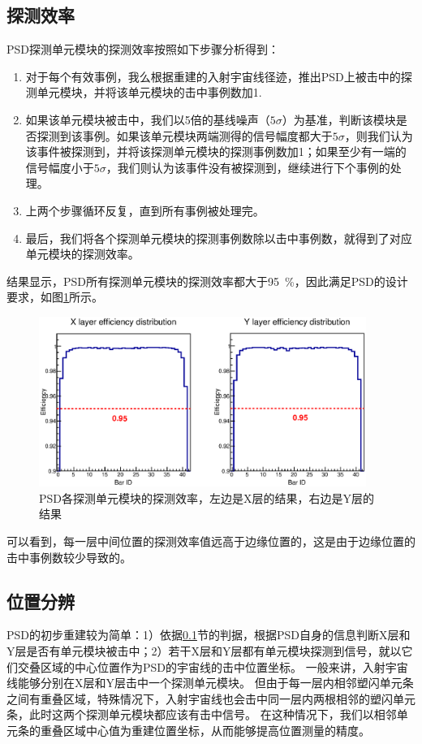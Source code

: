 \subsection{探测效率}
\label{sec:cosmic_ray:efficiency}
PSD探测单元模块的探测效率按照如下步骤分析得到：
\begin{enumerate}
	\item 对于每个有效事例，我么根据重建的入射宇宙线径迹，推出PSD上被击中的探测单元模块，并将该单元模块的击中事例数加1.
	\item 如果该单元模块被击中，我们以5倍的基线噪声（$5\sigma$）为基准，判断该模块是否探测到该事例。如果该单元模块两端测得的信号幅度都大于$5\sigma$，则我们认为该事件被探测到，并将该探测单元模块的探测事例数加1；如果至少有一端的信号幅度小于$5\sigma$，我们则认为该事件没有被探测到，继续进行下个事例的处理。
	\item 上两个步骤循环反复，直到所有事例被处理完。
	\item 最后，我们将各个探测单元模块的探测事例数除以击中事例数，就得到了对应单元模块的探测效率。
\end{enumerate}
结果显示，PSD所有探测单元模块的探测效率都大于\SI{95}{\percent}，因此满足PSD的设计要求，如图\ref{fig:cosmic_ray:efficiency}所示。
\begin{figure}[htbp]
	\centering
	\includegraphics[width=0.95\textwidth]{chap/cosmic_ray/fig/efficiency.eps}
	\caption{PSD各探测单元模块的探测效率，左边是X层的结果，右边是Y层的结果}
	\label{fig:cosmic_ray:efficiency}
\end{figure}
可以看到，每一层中间位置的探测效率值远高于边缘位置的，这是由于边缘位置的击中事例数较少导致的。

\subsection{位置分辨}
\label{sec:cosmic_ray:position_resolution}
PSD的初步重建较为简单：1）依据\ref{sec:cosmic_ray:efficiency}节的判据，根据PSD自身的信息判断X层和Y层是否有单元模块被击中；2）若干X层和Y层都有单元模块探测到信号，就以它们交叠区域的中心位置作为PSD的宇宙线的击中位置坐标。
一般来讲，入射宇宙线能够分别在X层和Y层击中一个探测单元模块。
但由于每一层内相邻塑闪单元条之间有重叠区域，特殊情况下，入射宇宙线也会击中同一层内两根相邻的塑闪单元条，此时这两个探测单元模块都应该有击中信号。
在这种情况下，我们以相邻单元条的重叠区域中心值为重建位置坐标，从而能够提高位置测量的精度。

